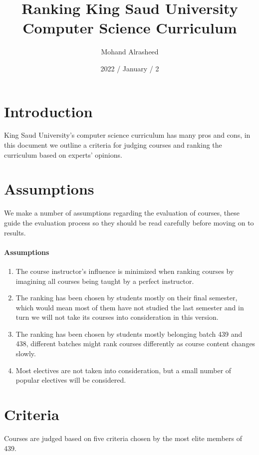 \documentclass[12pt,a4paper]{article}
\title{Ranking King Saud University Computer Science Curriculum}
\author{Mohand Alrasheed}
\date{2022 / January / 2}
\begin{document}

\maketitle
\clearpage

\tableofcontents
\clearpage


\section{Introduction}
King Saud University's computer science curriculum has many pros and cons, in this document we outline a criteria for judging courses and ranking the curriculum based on experts' opinions.

\section{Assumptions} 
We make a number of assumptions regarding the evaluation of courses, these guide the evaluation process so they should be read carefully before moving on to results.

\paragraph{Assumptions}
\begin{enumerate}
    \item The course instructor's influence is minimized when ranking courses by imagining all courses being taught by a perfect instructor.
    \item The ranking has been chosen by students mostly on their final semester, which would mean most of them have not studied the last semester and in turn we will not take its courses into consideration in this version.
    \item The ranking has been chosen by students mostly belonging batch 439 and 438, different batches might rank courses differently as course content changes slowly.
    \item Most electives are not taken into consideration, but a small number of popular electives will be considered. 
\end{enumerate}

\section{Criteria}
Courses are judged based on five criteria chosen by the most elite members of 439.
\end{document}
